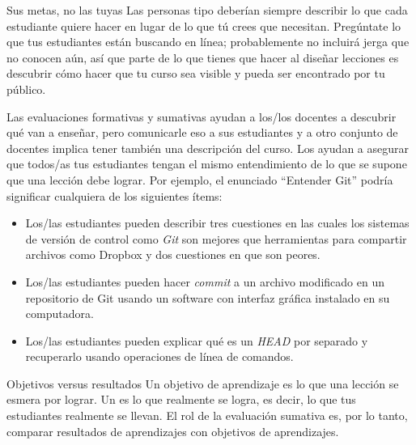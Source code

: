 \begin{aside}{Sus metas, no las tuyas}
Las personas tipo deberían siempre describir lo que cada estudiante quiere hacer
en lugar de lo que tú crees que necesitan.
Pregúntate lo que tus estudiantes están buscando en línea;
probablemente no incluirá jerga que no conocen aún,
así que parte de lo que tienes que hacer al diseñar lecciones es
descubrir cómo hacer que tu curso sea visible y pueda ser encontrado por tu público.
\end{aside}


 
Las evaluaciones formativas y sumativas ayudan a los/los docentes a descubrir qué van a enseñar,
pero comunicarle eso a sus estudiantes y a otro conjunto de docentes
implica tener también una descripción del curso.
Los 
ayudan a asegurar que
todos/as tus estudiantes tengan el mismo entendimiento de lo que se supone que una lección debe lograr.
Por ejemplo,
el enunciado ``Entender Git'' podría significar cualquiera de los siguientes ítems:
 
\begin{itemize}
 
\item
  Los/las estudiantes pueden describir tres cuestiones
  en las cuales los sistemas de versión de control como \emph{Git} son mejores que herramientas para compartir archivos como Dropbox
  y dos cuestiones en que son peores.
 
\item
Los/las estudiantes pueden hacer \emph{commit} a un archivo modificado en un repositorio de Git
usando un software con interfaz gráfica instalado en su computadora.
 
\item
  Los/las estudiantes pueden explicar qué es un \emph{HEAD} por separado
 y recuperarlo usando operaciones de línea de comandos.
 
\end{itemize}
 

\begin{aside}{Objetivos versus resultados}
 Un objetivo de aprendizaje es lo que una lección se esmera por lograr.
 Un  es lo que realmente se logra,
 es decir, lo que tus estudiantes realmente se llevan.
El rol de la evaluación sumativa es, por lo tanto,
comparar resultados de aprendizajes con objetivos de aprendizajes.
\end{aside}
 
